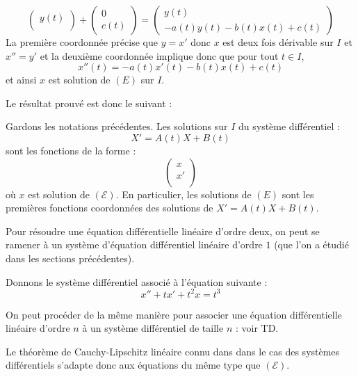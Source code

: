 \documentclass[french,11pt,twoside]{VcCours}
\begin{document}
\begin{itemize}
$$\begin{pmatrix}
y(t) \\
\end{pmatrix} + \begin{pmatrix}
0 \\
c(t)
\end{pmatrix} = \begin{pmatrix}
y(t) \\
-a(t) y(t)-b(t)x(t)+c(t)
\end{pmatrix}$$
La première coordonnée précise que $y=x'$ donc $x$ est deux fois dérivable sur $I$ et $x''=y'$ et la deuxième coordonnée implique donc que pour tout $t \in I$,
$$ x''(t)= -a(t)x'(t)-b(t)x(t)+c(t)$$
et ainsi $x$ est solution de $(E)$ sur $I$.
\end{itemize}



Le résultat prouvé est donc le suivant :

\begin{Proposition}{} Gardons les notations précédentes. Les solutions sur $I$ du système différentiel :
$$ X'= A(t)X+B(t) $$
sont les fonctions de la forme :
$$ \begin{pmatrix}
x \\
x' \\
\end{pmatrix}$$
où $x$ est solution de $(\mathcal{E})$. En particulier, les solutions de $(E)$ sont les premières fonctions coordonnées des solutions de $X'=A(t)X+B(t)$.
\end{Proposition}

\begin{Remarque}{}Pour résoudre une équation différentielle linéaire d'ordre deux, on peut se ramener à un système d'équation différentiel linéaire d'ordre $1$ (que l'on a étudié dans les sections précédentes).
\end{Remarque}

\begin{Exemple} Donnons le système différentiel associé à l'équation suivante :
$$ x''+tx'+t^2x=t^3$$

\vspace*{4cm}
\end{Exemple}

\begin{Remarque}{} On peut procéder de la même manière pour associer une équation différentielle linéaire d'ordre $n$ à un système différentiel de taille $n$ : voir TD.
\end{Remarque}



Le théorème de Cauchy-Lipschitz linéaire connu dans dans le cas des systèmes différentiels s'adapte donc aux équations du même type que $(\mathcal{E})$.
\end{document}
